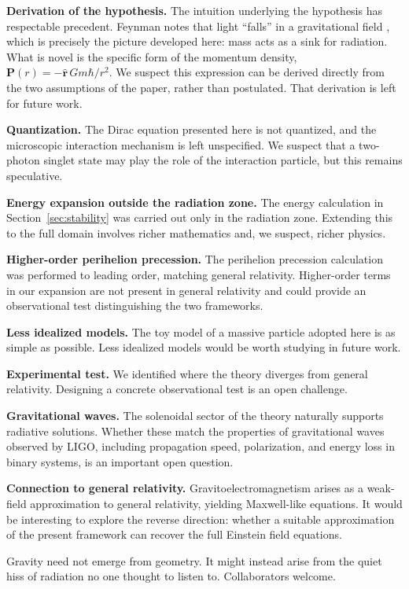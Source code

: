 \documentclass {article}
\renewcommand\vec{\mathbf}
\let\OldHat\hat
\renewcommand{\hat}[1]{\OldHat{\mathbf{#1}}}
\begin{document}
\textbf{Derivation of the hypothesis.} The intuition underlying the hypothesis has respectable precedent. Feynman notes that light ``falls'' in a gravitational field \cite{feynman_gravity}, which is precisely the picture developed here: mass acts as a sink for radiation. What is novel is the specific form of the momentum density, $\vec{P}(r) = -\hat{r}\, Gm\hbar/r^2$. We suspect this expression can be derived directly from the two assumptions of the paper, rather than postulated. That derivation is left for future work.

\textbf{Quantization.} The Dirac equation presented here is not quantized, and the microscopic interaction mechanism is left unspecified. We suspect that a two-photon singlet state may play the role of the interaction particle, but this remains speculative.

\textbf{Energy expansion outside the radiation zone.} The energy calculation in Section~\ref{sec:stability} was carried out only in the radiation zone. Extending this to the full domain involves richer mathematics and, we suspect, richer physics.

\textbf{Higher-order perihelion precession.} The perihelion precession calculation was performed to leading order, matching general relativity. Higher-order terms in our expansion are not present in general relativity and could provide an observational test distinguishing the two frameworks.

\textbf{Less idealized models.} The toy model of a massive particle adopted here is as simple as possible. Less idealized models would be worth studying in future work.

\textbf{Experimental test.} We identified where the theory diverges from general relativity. Designing a concrete observational test is an open challenge.

\textbf{Gravitational waves.} The solenoidal sector of the theory naturally supports radiative solutions. Whether these match the properties of gravitational waves observed by LIGO, including propagation speed, polarization, and energy loss in binary systems, is an important open question.

\textbf{Connection to general relativity.} Gravitoelectromagnetism arises as a weak-field approximation to general relativity, yielding Maxwell-like equations. It would be interesting to explore the reverse direction: whether a suitable approximation of the present framework can recover the full Einstein field equations.

Gravity need not emerge from geometry. It might instead arise from the quiet hiss of radiation no one thought to listen to. Collaborators welcome.
\end{document}
